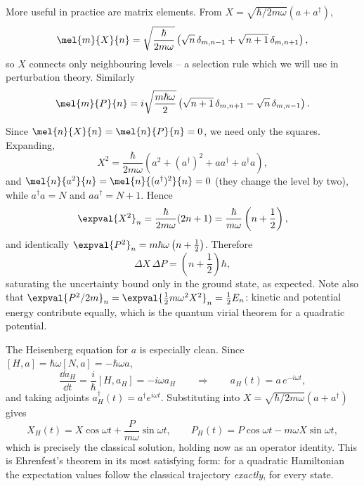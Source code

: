 More useful in practice are matrix elements. From $X = \sqrt{\hbar/2m\omega}(a + a^\dagger)$,
$$
\mel{m}{X}{n} = \sqrt{\frac{\hbar}{2m\omega}}\left( \sqrt{n}\,\delta_{m,n-1} + \sqrt{n+1}\,\delta_{m,n+1} \right),
$$
so $X$ connects only neighbouring levels -- a selection rule which we will use in perturbation theory. Similarly
$$
\mel{m}{P}{n} = i\sqrt{\frac{m\hbar\omega}{2}}\left( \sqrt{n+1}\,\delta_{m,n+1} - \sqrt{n}\,\delta_{m,n-1} \right).
$$

\begin{example}
    Since $\mel{n}{X}{n} = \mel{n}{P}{n} = 0$, we need only the squares. Expanding,
    $$
    X^2 = \frac{\hbar}{2m\omega}\left( a^2 + (a^\dagger)^2 + a a^\dagger + a^\dagger a \right),
    $$
    and $\mel{n}{a^2}{n} = \mel{n}{(a^\dagger)^2}{n} = 0$ (they change the level by two), while $a^\dagger a = N$ and $aa^\dagger = N+1$. Hence
    $$
    \expval{X^2}_n = \frac{\hbar}{2m\omega}(2n+1) = \frac{\hbar}{m\omega}\left(n + \frac{1}{2}\right),
    $$
    and identically $\expval{P^2}_n = m\hbar\omega\left(n + \frac12\right)$. Therefore
    $$
    \Delta X \, \Delta P = \left(n + \frac{1}{2}\right)\hbar,
    $$
    saturating the uncertainty bound only in the ground state, as expected. Note also that $\expval{P^2/2m}_n = \expval{\frac12 m\omega^2X^2}_n = \frac12 E_n$: kinetic and potential energy contribute equally, which is the quantum virial theorem for a quadratic potential.
\end{example}

\begin{example}
    The Heisenberg equation for $a$ is especially clean. Since $[H, a] = \hbar\omega[N,a] = -\hbar\omega a$,
    $$
    \frac{\dd a_H}{\dd t} = \frac{i}{\hbar}[H, a_H] = -i\omega a_H \qquad \Longrightarrow \qquad a_H(t) = a \, e^{-i\omega t},
    $$
    and taking adjoints $a_H^\dagger(t) = a^\dagger e^{i\omega t}$. Substituting into $X = \sqrt{\hbar/2m\omega}(a + a^\dagger)$ gives
    $$
    X_H(t) = X\cos\omega t + \frac{P}{m\omega}\sin\omega t, \qquad P_H(t) = P \cos\omega t - m\omega X \sin\omega t,
    $$
    which is precisely the classical solution, holding now as an operator identity. This is Ehrenfest's theorem in its most satisfying form: for a quadratic Hamiltonian the expectation values follow the classical trajectory \emph{exactly}, for every state.
\end{example}

